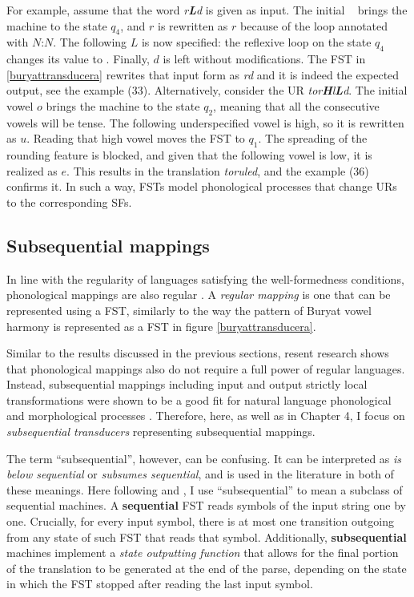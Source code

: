 For example, assume that the word \emph{\textopeno r\textbf{L}d} is given as input.
The initial \textopeno~ brings the machine to the state $q_4$, and $r$ is rewritten as $r$ because of the loop annotated with $N$:$N$.
The following $L$ is now specified: the reflexive loop on the state $q_4$ changes its value to \textopeno.
Finally, $d$ is left without modifications.
The FST in \ref{buryattransducera} rewrites that input form as \emph{\textopeno r\textopeno d} and it is indeed the expected output, see the example (33).
Alternatively, consider the UR \emph{tor\textbf{H}l\textbf{L}d}.
The initial vowel $o$ brings the machine to the state $q_2$, meaning that all the consecutive vowels will be tense.
The following underspecified vowel is high, so it is rewritten as $u$.
Reading that high vowel moves the FST to $q_1$.
The spreading of the rounding feature is blocked, and given that the following vowel is low, it is realized as $e$.
This results in the translation \emph{toruled}, and the example (36) confirms it.
In such a way, FSTs model phonological processes that change URs to the corresponding SFs.





\subsection{Subsequential mappings}
\label{RussianWFDFST}

In line with the regularity of languages satisfying the well-formedness conditions, phonological mappings are also regular \citep{Johnson1972,Koskenniemi1983,KaplanKay94}.
A \emph{regular mapping} is one that can be represented using a FST, similarly to the way the pattern of Buryat vowel harmony is represented as a FST in figure \ref{buryattransducera}.


Similar to the results discussed in the previous sections, resent research shows that phonological mappings also do not require a full power of regular languages.
Instead, subsequential mappings including input and output strictly local transformations were shown to be a good fit for natural language phonological and morphological processes \citep{Chandlee2014,ChandleeHeinz2018}.
Therefore, here, as well as in Chapter 4, I focus on \emph{subsequential transducers} representing subsequential mappings.


The term ``subsequential'', however, can be confusing.
It can be interpreted as \emph{is below sequential} or \emph{subsumes sequential}, and is used in the literature in both of these meanings.
Here following \cite{RocheSchabes1997} and  \cite{DeLaHiguera2010}, I use ``subsequential'' to mean a subclass of sequential machines.
A \textbf{sequential} FST reads symbols of the input string one by one.
Crucially, for every input symbol, there is at most one transition outgoing from any state of such FST that reads that symbol.
Additionally, \textbf{subsequential} machines implement a \emph{state outputting function} that allows for the final portion of the translation to be generated at the end of the parse, depending on the state in which the FST stopped after reading the last input symbol.

